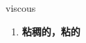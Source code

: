 
\begin{frame}
{\huge viscous}
\begin{center}
\begin{enumerate}\Large
  \item \textbf{粘稠的，粘的}
\end{enumerate}
\end{center}
\end{frame}
